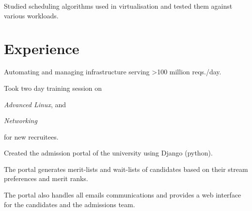 \documentclass[]{deedy}
\begin{document}
\begin{minipage}[t]{0.66\textwidth}
\begin{tightemize}
\item Studied scheduling algorithms used in virtualisation and tested them against various workloads.
\end{tightemize}


\section{Experience}

\begin{tightemize}
\item Automating and managing infrastructure serving >100 million reqs./day.
\item Took two day training session on 
\begin{enumerate*}[label=(\roman*)]
  \item \textit{Advanced Linux}, and
  \item \textit{Networking}
\end{enumerate*}
 for new recruitees.
\end{tightemize}
\sectionsep

\begin{tightemize}
\item Created the admission portal of the university using Django (python).
\item The portal generates merit-lists and wait-lists of candidates based on their stream preferences and merit ranks. 
\item The portal also handles all emails communications and provides a web interface for the candidates and the admissions team.
\end{tightemize}
\sectionsep



\end{minipage}
\end{document}
